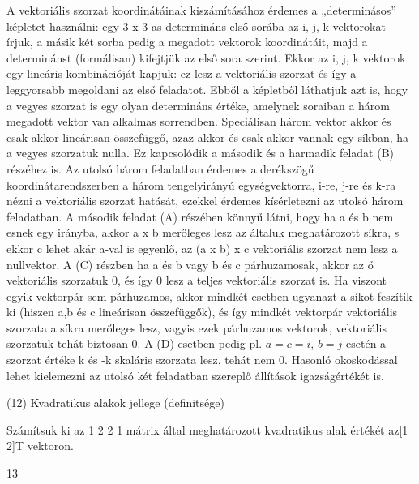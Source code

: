 \begin{frame}
  \begin{tcolorbox}[title={11/1. -N-}]
    A vektoriális szorzat koordinátáinak kiszámításához érdemes a „determinásos” képletet használni: egy 3 x 3-as determináns első sorába az i, j, k vektorokat írjuk, a másik két sorba pedig a megadott vektorok koordinátáit, majd a determinánst (formálisan) kifejtjük az első sora szerint. Ekkor az i, j, k vektorok egy lineáris kombinációját kapjuk: ez lesz a vektoriális szorzat és így a leggyorsabb megoldani az első feladatot. Ebből a képletből láthatjuk azt is, hogy a vegyes szorzat is egy olyan determináns értéke, amelynek soraiban a három megadott vektor van alkalmas sorrendben. Speciálisan három vektor akkor és csak akkor lineárisan összefüggő, azaz akkor és csak akkor vannak egy síkban, ha a vegyes szorzatuk nulla. Ez kapcsolódik a második és a harmadik feladat (B) részéhez is. Az utolsó három feladatban érdemes a derékszögű koordinátarendszerben a három tengelyirányú egységvektorra, i-re, j-re és k-ra nézni a vektoriális szorzat hatását, ezekkel érdemes kísérletezni az utolsó három feladatban. A második feladat (A) részében könnyű látni, hogy ha a és b nem esnek egy irányba, akkor a x b merőleges lesz az általuk meghatározott síkra, s ekkor c lehet akár a-val is egyenlő, az (a x b) x c vektoriális szorzat nem lesz a nullvektor. A (C) részben ha a és b vagy b és c párhuzamosak, akkor az ő vektoriális szorzatuk 0, és így 0 lesz a teljes vektoriális szorzat is. Ha viszont egyik vektorpár sem párhuzamos, akkor mindkét esetben ugyanazt a síkot feszítik ki (hiszen a,b és c lineárisan összefüggők), és így mindkét vektorpár vektoriális szorzata a síkra merőleges lesz, vagyis ezek párhuzamos vektorok, vektoriális szorzatuk tehát biztosan 0. A (D) esetben pedig pl. $a = c = i$, $b = j$ esetén a szorzat értéke k és -k skaláris szorzata lesz, tehát nem 0. Hasonló okoskodással lehet kielemezni az utolsó két feladatban szereplő állítások igazságértékét is.
  \end{tcolorbox}
\end{frame}


\begin{frame}[plain]
\begin{tcolorbox}[center, colback={myyellow}, coltext={black}, colframe={myyellow}]
    {\RHuge  (12) Kvadratikus alakok jellege (definitsége)}
    \mmedskip
\end{tcolorbox}
\end{frame}

\begin{frame}
  \begin{tcolorbox}[title={12/1. -N-}]
     Számítsuk ki az 1 2 2 1 mátrix által meghatározott kvadratikus alak értékét az[1 2]T vektoron.

  \tcblower

    \mmedskip 
    
    13
  \end{tcolorbox}
\end{frame}


